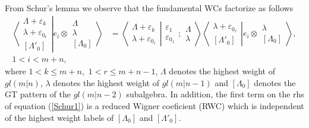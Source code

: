 \documentclass[12pt]{article}
\def\nn{\nonumber}
\begin{document}
From Schur's lemma we observe that the fundamental WCs factorize as follows
\begin{align}
\left\langle\left. 
\begin{array}{c} \Lambda+\varepsilon_k\\ \lambda+\varepsilon_{0_r} \\ {[\Lambda'_0]} \end{array}
\right|\right.
\left.
e_i\otimes \begin{array}{c} \Lambda \\ \lambda \\
{[\Lambda_0]} \end{array}
\right\rangle &= 
\left\langle\left. 
\begin{array}{c} \Lambda+\varepsilon_k\\ \lambda+\varepsilon_{0_r} 
 \end{array}
\right|\right.
\left.
\begin{array}{c} \varepsilon_1 \\ \varepsilon_{0_1} 
 \end{array}
; \begin{array}{c} \Lambda \\ \lambda
 \end{array}
\right\rangle 
\left\langle\left. 
\begin{array}{c} \lambda+\varepsilon_{0_r} \\ {[\Lambda'_0]} \end{array}
\right|\right.
\left.
e_i\otimes \begin{array}{c} \lambda \\
{[\Lambda_0]} \end{array}
\right\rangle,\label{Schur1}\\ 
1 < i < m+n, \nn
\end{align}
where $1 < k \leq m+n$,~$1 < r \leq m+n-1$, 
$\Lambda$ denotes the highest weight of $gl(m|n)$, $\lambda$ denotes the highest weight of $gl(m|n-1)$ and $[\Lambda_0]$ denotes the GT pattern of the $gl(m|n-2)$ subalgebra. In addition, the first term on the rhs of equation (\ref{Schur1}) is a reduced Wigner coeficient (RWC) which is independent of the highest
weight labels of $[\Lambda_0]$ and $[\Lambda'_0]$.
\end{document}

